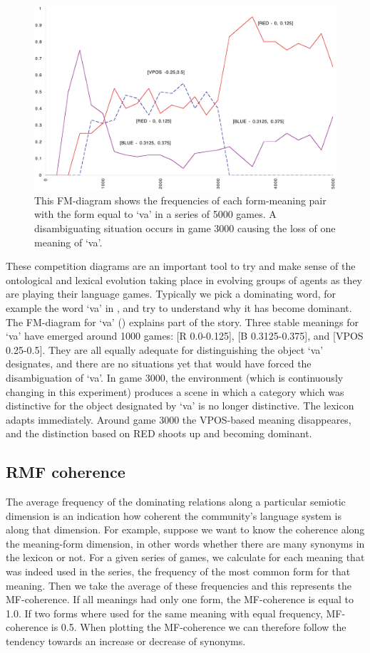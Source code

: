 \begin{figure}[htbp]
  \centerline{\includegraphics[width=.80\textwidth]{chap7/figs/fm}}
\caption{ \label{FM-diagram} This FM-diagram shows
the frequencies of each form-meaning pair with 
the form equal to `va' in a series of 5000 games.
A disambiguating situation occurs in game 3000
causing the loss of one meaning of `va'.}
\end{figure}

These competition diagrams are an important tool to try 
and make sense of the ontological and lexical evolution
taking place in evolving groups of agents as they are
playing their language games. Typically we pick
a dominating word, for example the word `va' in 
, and try to understand
why it has become dominant. 
The FM-diagram for `va' () explains
part of the story. Three stable meanings for `va' have emerged
around 1000 games: 
[R 0.0-0.125], [B 0.3125-0.375], and [VPOS 0.25-0.5]. 
They are all equally adequate for distinguishing the object
`va' designates, and there are no situations yet
that would have forced the disambiguation of `va'. 
In game 3000, the environment (which is continuously 
changing in this experiment) produces a scene in which
a category which was distinctive for the object designated by 
`va' is no longer distinctive. The lexicon adapts 
immediately. Around game 3000 the VPOS-based meaning disappeares, 
and the distinction based on RED shoots up and becoming dominant. 

\subsection{RMF coherence}

The average frequency of the dominating relations along
a particular semiotic dimension is an indication how coherent the
community's language system is along that dimension.
For example, suppose we want to know the coherence along
the meaning-form dimension, in other words
whether there are many synonyms in the lexicon or not.
For a given series of games, we calculate for each meaning
that was indeed used in the series,
the frequency of the most common form
for that meaning. Then we take the average of these frequencies
and this represents the MF-coherence. If all meanings had
only one form, the MF-coherence is equal to 1.0. If two forms
where used for the same meaning with equal frequency, 
MF-coherence is 0.5. When plotting the
MF-coherence we can therefore follow the tendency towards
an increase or decrease of synonyms.

